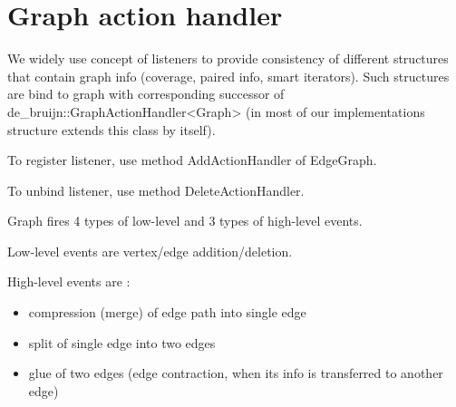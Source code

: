 \section{Graph action handler}

We widely use concept of listeners to provide consistency of different structures that contain graph info (coverage, paired info, smart iterators). Such structures are bind to graph with corresponding successor of de\_bruijn::GraphActionHandler<Graph> (in most of our implementations structure extends this class by itself).

To register listener, use method AddActionHandler of EdgeGraph.

To unbind listener, use method DeleteActionHandler.

Graph fires 4 types of low-level and 3 types of high-level events. 

Low-level events are vertex/edge addition/deletion. 

High-level events are :
\begin{itemize}
\item compression (merge) of edge path into single edge
\item split of single edge into two edges
\item glue of two edges (edge contraction, when its info is transferred to another edge)
\end{itemize}



